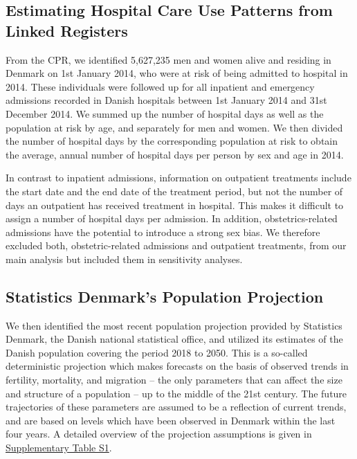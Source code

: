 \subsection{Estimating Hospital Care Use Patterns from Linked Registers}

From the CPR, we identified 5,627,235 men and women alive and residing in Denmark 
on 1st January 2014, who were at risk of being admitted to hospital in 2014. These 
individuals were followed up for all inpatient and emergency admissions recorded 
in Danish hospitals between 1st January 2014 and 31st December 2014. We summed up 
the number of hospital days as well as the population at risk by age, and separately 
for men and women. We then divided the number of hospital days by the corresponding 
population at risk to obtain the average, annual number of hospital days per person 
by sex and age in 2014.

In contrast to inpatient admissions, information on outpatient treatments include 
the start date and the end date of the treatment period, but not the number of days 
an outpatient has received treatment in hospital. This makes it difficult to assign 
a number of hospital days per admission. In addition, obstetrics-related admissions 
have the potential to introduce a strong sex bias. We therefore excluded both, 
obstetric-related admissions and outpatient treatments, from our main analysis but 
included them in sensitivity analyses. \\

\subsection{Statistics Denmark's Population Projection}

We then identified the most recent population projection provided by Statistics 
Denmark, the Danish national statistical office,\citep{statden2018} and utilized 
its estimates of the Danish population covering the period 2018 to 2050. This is 
a so-called deterministic projection which makes forecasts on the basis of observed 
trends in fertility, mortality, and migration -- the only parameters that can affect 
the size and structure of a population -- up to the middle of the 21st century. The 
future trajectories of these parameters are assumed to be a reflection of current 
trends, and are based on levels which have been observed in Denmark within the last 
four years.\citep{statden2018} A detailed overview of the projection 
assumptions is given in \hyperref[ch5:tabS1]{Supplementary Table S1}.\\

